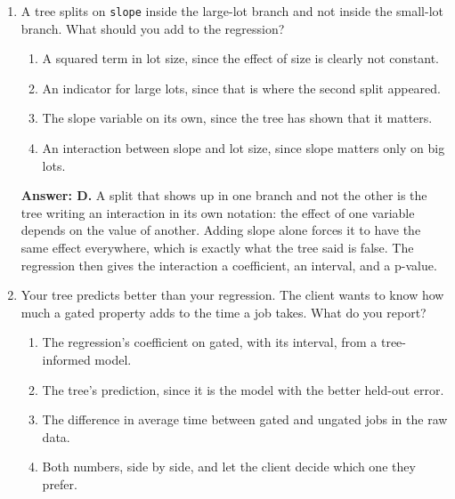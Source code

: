 \documentclass[11pt]{article}
\begin{document}
\begin{enumerate}[itemsep=14pt]
\vspace{2pt}
\textbf{Answer: C.} Trees are greedy: once bedrooms are in, a variable that largely repeats bedrooms has nothing left to add and will never be chosen. Absence from the tree is a reason to look at the correlations, not a verdict on the variable. It is a candidate for dropping only after you have checked what it overlaps with.
\vspace{4pt}

\item A tree splits on \texttt{slope} inside the large-lot branch and not inside the small-lot branch. What should you add to the regression?

\begin{enumerate}[label=\Alph*., itemsep=1pt, topsep=3pt]
  \item A squared term in lot size, since the effect of size is clearly not constant.
  \item An indicator for large lots, since that is where the second split appeared.
  \item The slope variable on its own, since the tree has shown that it matters.
  \item An interaction between slope and lot size, since slope matters only on big lots.
\end{enumerate}

\vspace{2pt}
\textbf{Answer: D.} A split that shows up in one branch and not the other is the tree writing an interaction in its own notation: the effect of one variable depends on the value of another. Adding slope alone forces it to have the same effect everywhere, which is exactly what the tree said is false. The regression then gives the interaction a coefficient, an interval, and a p-value.
\vspace{4pt}

\item Your tree predicts better than your regression. The client wants to know how much a gated property adds to the time a job takes. What do you report?

\begin{enumerate}[label=\Alph*., itemsep=1pt, topsep=3pt]
  \item The regression's coefficient on gated, with its interval, from a tree-informed model.
  \item The tree's prediction, since it is the model with the better held-out error.
  \item The difference in average time between gated and ungated jobs in the raw data.
  \item Both numbers, side by side, and let the client decide which one they prefer.
\end{enumerate}


\end{enumerate}
\end{document}
